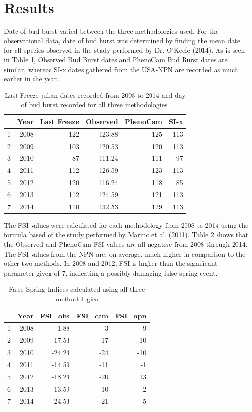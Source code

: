 \documentclass{article}\usepackage[]{graphicx}\usepackage[]{color}
\begin{document}
\section{Results}
Date of bud burst varied between the three methodologies used. For the observational data, date of bud burst was determined by finding the mean date for all species observed in the study performed by Dr. O'Keefe (2014). %
As is seen in Table 1, Observed Bud Burst dates and PhenoCam Bud Burst dates are similar, whereas SI-x dates gathered from the USA-NPN are recorded as much earlier in the year.

\begin{table}[ht]
\centering
\caption{Last Freeze julian dates recorded from 2008 to 2014 and day of bud burst recorded for all three methodologies.} 
\begin{tabular}{rrrrrr}
  \hline
 & Year & Last Freeze & Observed & PhenoCam & SI-x \\ 
  \hline
1 & 2008 & 122 & 123.88 & 125 & 113 \\ 
  2 & 2009 & 103 & 120.53 & 120 & 113 \\ 
  3 & 2010 &  87 & 111.24 & 111 &  97 \\ 
  4 & 2011 & 112 & 126.59 & 123 & 113 \\ 
  5 & 2012 & 120 & 116.24 & 118 &  85 \\ 
  6 & 2013 & 112 & 124.59 & 121 & 113 \\ 
  7 & 2014 & 110 & 132.53 & 129 & 113 \\ 
   \hline
\end{tabular}
\end{table}

The FSI values were calculated for each methodology from 2008 to 2014 using the formula based of the study performed by Marino et al. (2011). Table 2 shows that the Observed and PhenoCam FSI values are all negative from 2008 through 2014. The FSI values from the NPN are, on average, much higher in comparison to the other two methods. In 2008 and 2012, FSI is higher than the significant parameter given of 7, indicating a possibly damaging false spring event. 
\begin{table}[ht]
\centering
\caption{False Spring Indices calculated using all three methodologies} 
\begin{tabular}{rrrrr}
  \hline
 & Year & FSI\_obs & FSI\_cam & FSI\_npn \\ 
  \hline
1 & 2008 & -1.88 &  -3 &   9 \\ 
  2 & 2009 & -17.53 & -17 & -10 \\ 
  3 & 2010 & -24.24 & -24 & -10 \\ 
  4 & 2011 & -14.59 & -11 &  -1 \\ 
  5 & 2012 & -18.24 & -20 &  13 \\ 
  6 & 2013 & -13.59 & -10 &  -2 \\ 
  7 & 2014 & -24.53 & -21 &  -5 \\ 
   \hline
\end{tabular}
\end{table}
\end{document}
